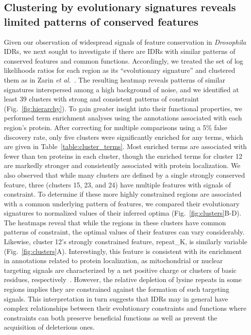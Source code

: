 \subsection{Clustering by evolutionary signatures reveals limited patterns of conserved features}
Given our observation of widespread signals of feature conservation in \textit{Drosophila} IDRs, we next sought to investigate if there are IDRs with similar patterns of conserved features and common functions. Accordingly, we treated the set of log likelihoods ratios for each region as its ``evolutionary signature'' and clustered them as in Zarin \textit{et al.}~\cite{Zarin2019}. The resulting heatmap reveals patterns of similar signatures interspersed among a high background of noise, and we identified at least 39 clusters with strong and consistent patterns of constraint (Fig.~\ref{fig:hierarchy}). To gain greater insight into their functional properties, we performed term enrichment analyses using the annotations associated with each region's protein. After correcting for multiple comparisons using a 5\% false discovery rate, only five clusters were significantly enriched for any terms, which are given in Table~\ref{table:cluster_terms}. Most enriched terms are associated with fewer than ten proteins in each cluster, though the enriched terms for cluster 12 are markedly stronger and consistently associated with protein localization. We also observed that while many clusters are defined by a single strongly conserved feature, three (clusters 15, 23, and 24) have multiple features with signals of constraint. To determine if these more highly constrained regions are associated with a common underlying pattern of features, we compared their evolutionary signatures to normalized values of their inferred optima (Fig.~\ref{fig:clusters}B-D). The heatmaps reveal that while the regions in these clusters have common patterns of constraint, the optimal values of their features can vary considerably. Likewise, cluster 12's strongly constrained feature, repeat\_K, is similarly variable (Fig.~\ref{fig:clusters}A). Interestingly, this feature is consistent with its enrichment in annotations related to protein localization, as mitochondrial or nuclear targeting signals are characterized by a net positive charge or clusters of basic residues, respectively~\cite{Moulin2019, Lu2021}. However, the relative depletion of lysine repeats in some regions implies they are constrained against the formation of such targeting signals. This interpretation in turn suggests that IDRs may in general have complex relationships between their evolutionary constraints and functions where constraints can both preserve beneficial functions as well as prevent the acquisition of deleterious ones.

